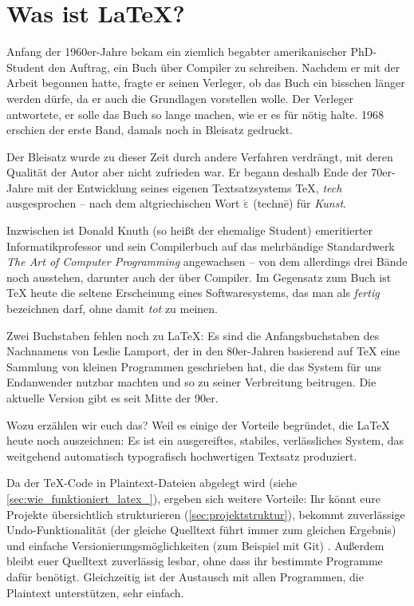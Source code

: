 \section{Was ist \LaTeX?}

Anfang der 1960er-Jahre bekam ein ziemlich begabter amerikanischer PhD-Student den Auftrag, ein Buch über Compiler zu schreiben.
Nachdem er mit der Arbeit begonnen hatte, fragte er seinen Verleger, ob das Buch ein bisschen länger werden dürfe, da er auch die Grundlagen vorstellen wolle.
Der Verleger antwortete, er solle das Buch so lange machen, wie er es für nötig halte.
1968 erschien der erste Band, damals noch in Bleisatz gedruckt.

Der Bleisatz wurde zu dieser Zeit durch andere Verfahren verdrängt, mit deren Qualität der Autor aber nicht zufrieden war. 
Er begann deshalb Ende der 70er-Jahre mit der Entwicklung seines eigenen Textsatzsystems \TeX, \emph{tech} ausgesprochen – nach dem altgriechischen Wort \texttau$\mathrm{\acute{\varepsilon}}$\textchi\textnu\texteta{} (technē) für \emph{Kunst}.

Inzwischen ist Donald Knuth (so heißt der ehemalige Student) emeritierter Informatikprofessor und sein Compilerbuch auf das mehrbändige Standardwerk \emph{The Art of Computer Programming} angewachsen – von dem allerdings drei Bände noch ausstehen, darunter auch der über Compiler.
Im Gegensatz zum Buch ist \TeX{} heute die seltene Erscheinung eines Softwaresystems, das man als \emph{fertig} bezeichnen darf, ohne damit \emph{tot} zu meinen.

Zwei Buchstaben fehlen noch zu \LaTeX: 
Es sind die Anfangsbuchstaben des Nachnamens von Leslie Lamport, der in den 80er-Jahren basierend auf \TeX{} eine Sammlung von kleinen Programmen geschrieben hat, die das System für uns Endanwender nutzbar machten und so zu seiner Verbreitung beitrugen.
Die aktuelle Version \LaTeXe{} gibt es seit Mitte der 90er.

Wozu erzählen wir euch das? 
Weil es einige der Vorteile begründet, die \LaTeX{} heute noch auszeichnen:
Es ist ein ausgereiftes, stabiles, verlässliches System,
das weitgehend automatisch typografisch hochwertigen Textsatz produziert.

Da der \TeX-Code in Plaintext-Dateien abgelegt wird (siehe \cref{sec:wie_funktioniert_latex_}), ergeben sich weitere Vorteile:
Ihr könnt eure Projekte übersichtlich strukturieren (\cref{sec:projektstruktur}), bekommt zuverlässige Undo-Funktionalität (der gleiche Quelltext führt immer zum gleichen Ergebnis) und einfache Versionierungsmöglichkeiten (zum Beispiel mit Git)$ $  $ $.
Außerdem bleibt euer Quelltext zuverlässig lesbar, ohne dass ihr bestimmte Programme dafür benötigt.
Gleichzeitig ist der Austausch mit allen Programmen, die Plaintext unterstützen, sehr einfach.

